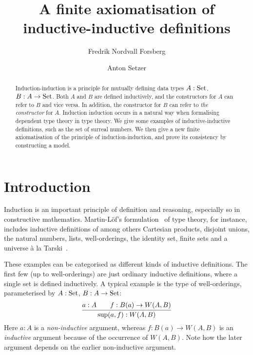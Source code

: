 \documentclass{article}
\title{A finite axiomatisation of inductive-inductive definitions}
\author{Fredrik Nordvall Forsberg}
\author{Anton Setzer}
\affil{Swansea University \\
Singleton  Park \\
Swansea SA2 8PP, UK}
\begin{document}
\maketitle

\begin{abstract}
  \noindent 
  Induction-induction is a principle for mutually defining data types
  $A : \text{Set}$, $B : A \to \text{Set}$. Both $A$ and $B$ are defined
  inductively, and the constructors for $A$ can refer to $B$ and vice
  versa. In addition, the constructor for $B$ can refer to \emph{the
    constructor} for $A$. Induction induction occurs in a natural way
  when formalising dependent type theory in type theory.  We give some
  examples of inductive-inductive definitions, such as the set of
  surreal numbers. We then give a new finite axiomatisation of the
  principle of induction-induction, and prove its consistency by
  constructing a model.
\end{abstract}

\section{Introduction} %
\label{sec:introduction}


Induction is an important principle of definition and reasoning,
especially so in constructive mathematics.  Martin-L\"of's
formulation~\cite{martinlof1984bibliopolis} of type theory, for
instance, includes inductive definitions of among others Cartesian
products, disjoint unions, the natural numbers, lists, well-orderings,
the identity set, finite sets and a universe \`a la
Tarski~\cite{palmgren1998twentyfiveyears}.

These examples can be categorised as different kinds of inductive
definitions. The first few (up to well-orderings) are just ordinary inductive
definitions, where a single set is defined inductively. A typical
example is the type of well-orderings, parameterised by $A : \text{Set}$, $B
: A \to \text{Set}$:
\[
\infer{\Wsup(a, f) : W(A, B)}{a : A & \quad f : B(a) \to W(A, B)}
\]
Here $a : A$ is a \emph{non-inductive} argument, whereas $f : B(a) \to
W(A, B)$ is an \emph{inductive} argument because of the occurrence of
$W(A, B)$. Note how the later argument depends on the earlier
non-inductive argument.
\end{document}
